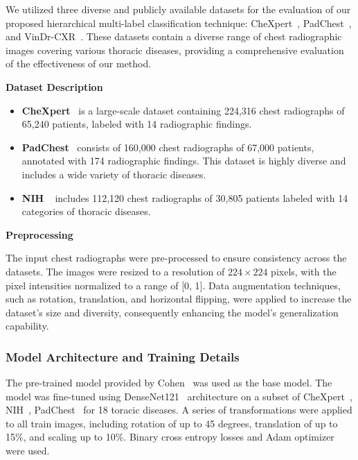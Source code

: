 We utilized three diverse and publicly available datasets for the evaluation of our proposed hierarchical multi-label classification technique: CheXpert~\cite{irvin_CheXpert_2019}, PadChest~\cite{bustos_Padchest_2020}, and VinDr-CXR~\cite{nguyen_VinDrCXR_2022}. These datasets contain a diverse range of chest radiographic images covering various thoracic diseases, providing a comprehensive evaluation of the effectiveness of our method.

\textbf{Dataset Description}

\begin{itemize}
    \item  \textbf{CheXpert}~\cite{irvin_CheXpert_2019} is a large-scale dataset containing 224,316 chest radiographs of 65,240 patients, labeled with 14 radiographic findings.

    \item \textbf{PadChest}~\cite{bustos_Padchest_2020} consists of 160,000 chest radiographs of 67,000 patients, annotated with 174 radiographic findings. This dataset is highly diverse and includes a wide variety of thoracic diseases.

    \item \textbf{NIH }~\cite{wang_ChestXRay8_2017} includes 112,120 chest radiographs of 30,805 patients labeled with 14 categories of thoracic diseases.
\end{itemize}

\textbf{Preprocessing}

The input chest radiographs were pre-processed to ensure consistency across the datasets. The images were resized to a resolution of $224 \times 224$ pixels, with the pixel intensities normalized to a range of [0, 1]. Data augmentation techniques, such as rotation, translation, and horizontal flipping, were applied to increase the dataset's size and diversity, consequently enhancing the model's generalization capability.



\subsubsection{Model Architecture and Training Details}

The pre-trained model provided by Cohen~\cite{cohen_TorchXRayVision_2022} was used as the base model. The model was fine-tuned using DenseNet121~\cite{huang_Densely_2017} architecture on a subset of CheXpert~\cite{irvin_CheXpert_2019}, NIH~\cite{wang_ChestXRay8_2017}, PadChest~\cite{bustos_Padchest_2020} for 18 toracic diseases. A series of transformations were applied to all train images, including rotation of up to 45 degrees, translation of up to 15\%, and scaling up to 10\%. Binary cross entropy losses and Adam optimizer were used.


